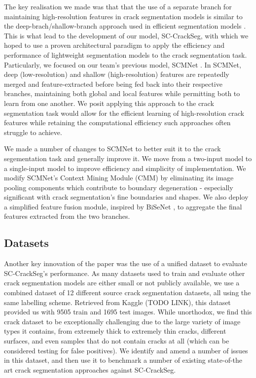 \documentclass[a4paper,12pt]{report}
\begin{document}
    The key realisation we made was that that the use of a separate branch for maintaining high-resolution features in crack segmentation models \cite{nayyeri2021multi} is similar to the deep-brach/shallow-branch approach used in efficient segmentation models \cite{yu2018bisenet} \cite{poudel2018contextnet}. This is what lead to the development of our model, SC-CrackSeg, with which we hoped to use a proven architectural paradigm to apply the efficiency and performance of lightweight segmentation models to the crack segmentation task. Particularly, we focused on our team's previous model, SCMNet \cite{singha2021scmnet}. In SCMNet, deep (low-resolution) and shallow (high-resolution) features are repeatedly merged and feature-extracted before being fed back into their respective branches, maintaining both global and local features while permitting both to learn from one another. We posit applying this approach to the crack segmentation task would allow for the efficient learning of high-resolution crack features while retaining the computational efficiency such approaches often struggle to achieve. 

    We made a number of changes to SCMNet to better suit it to the crack segementation task and generally improve it. We move from a two-input model to a single-input model to improve efficiency and simplicity of implementation. We modify SCMNet's Context Mining Module (CMM) by eliminating its image pooling components which contribute to boundary degeneration - especially significant with crack segmentation's fine boundaries and shapes. We also deploy a simplified feature fusion module, inspired by BiSeNet \cite{yu2018bisenet}, to aggregate the final features extracted from the two branches. %

    \subsection{Datasets}
    Another key innovation of the paper was the use of a unified dataset to evaluate SC-CrackSeg's performance. As many datasets used to train and evaluate other crack segmentation models are either small or not publicly available, we use a combined dataset of 12 different source crack segmentation datasets, all using the same labelling scheme. Retrieved from Kaggle (TODO LINK), this dataset provided us with 9505 train and 1695 test images. While unorthodox, we find this crack dataset to be exceptionally challenging due to the large variety of image types it contains, from extremely thick to extremely thin cracks, different surfaces, and even samples that do not contain cracks at all (which can be considered testing for false positives). We identify and amend a number of issues in this dataset, and then use it to benchmark a number of existing state-of-the art crack segmentation approaches against SC-CrackSeg.
\end{document}
